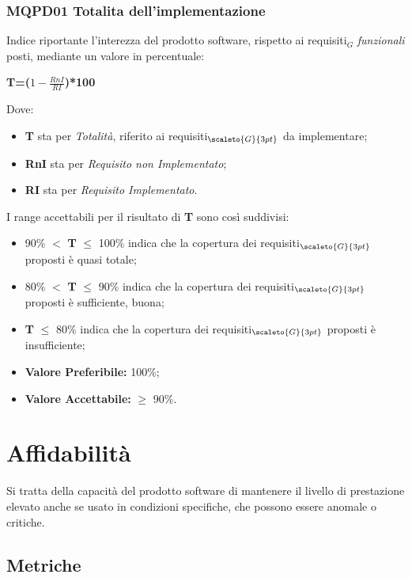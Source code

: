 \subsubsection{MQPD01 Totalita dell’implementazione} \label{QualitàDelProdottoFunzionalitàMetricheMQPD01}
Indice riportante l’interezza del prodotto software, rispetto ai requisiti$_G$ \textit{funzionali} posti, mediante un valore in percentuale:
\begin{center}
	\textbf{T=($1-\frac{RnI}{RI}$)*100}
\end{center}
Dove:
\begin{itemize}
	\item \textbf{T} sta per \textit{Totalità}, riferito ai requisiti$_{\scaleto{G}{3pt}}$ da implementare;
	\item \textbf{RnI} sta per \textit{Requisito non Implementato};
	\item \textbf{RI} sta per \textit{Requisito Implementato}.
\end{itemize}
I range accettabili per il risultato di \textbf{T} sono così suddivisi:
\begin{itemize}
	\item 90\% $<$ \textbf{T} $\leq$ 100\% indica che la copertura dei requisiti$_{\scaleto{G}{3pt}}$ proposti è quasi totale;
	\item 80\% $<$ \textbf{T} $\leq$ 90\% indica che la copertura dei requisiti$_{\scaleto{G}{3pt}}$ proposti è sufficiente, buona;
	\item \textbf{T} $\leq$ 80\% indica che la copertura dei requisiti$_{\scaleto{G}{3pt}}$ proposti è insufficiente;
	\item \textbf{Valore Preferibile:} 100\%;
	\item \textbf{Valore  Accettabile:} $\geq$ 90\%.
\end{itemize}

\section{Affidabilità} \label{QualitàDelProdottoAffidabilità}
Si tratta della capacità del prodotto software di mantenere il livello di prestazione elevato anche se usato in condizioni specifiche, che possono essere anomale o critiche.
\subsection{Metriche} \label{QualitàDelProdottoAffidabilitàMetriche}
